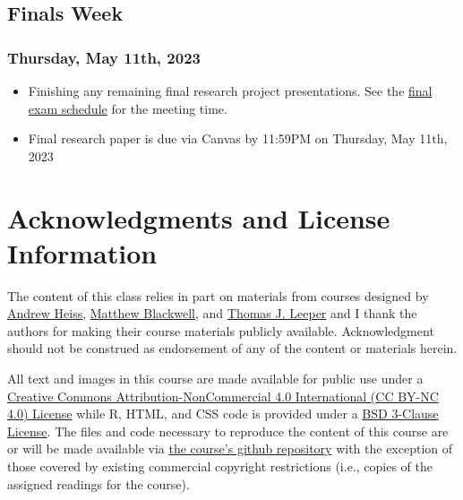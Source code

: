\documentclass[12pt,]{article}
\begin{document}
\hypertarget{finals-week}{%
\subsection{Finals Week}\label{finals-week}}

\hypertarget{thursday-may-11th-2023}{%
\subsubsection{Thursday, May 11th, 2023}\label{thursday-may-11th-2023}}

\begin{itemize}
\item
  Finishing any remaining final research project presentations. See the
  \href{https://registrar.unt.edu/exams/final-exam-schedule/spring}{final
  exam schedule} for the meeting time.
\item
  Final research paper is due via Canvas by 11:59PM on Thursday, May
  11th, 2023
\end{itemize}

\hypertarget{acknowledgments-and-license-information}{%
\section{Acknowledgments and License
Information}\label{acknowledgments-and-license-information}}

\noindent The content of this class relies in part on materials from
courses designed by
\href{https://github.com/andrewheiss/evalsp23.classes.andrewheiss.com}{Andrew
Heiss}, \href{https://github.com/mattblackwell/gov2003-f21-site}{Matthew
Blackwell}, and \href{https://github.com/leeper/designcourse}{Thomas J.
Leeper} and I thank the authors for making their course materials
publicly available. Acknowledgment should not be construed as
endorsement of any of the content or materials herein.

All text and images in this course are made available for public use
under a \href{https://creativecommons.org/licenses/by-nc/4.0/}{Creative
Commons Attribution-NonCommercial 4.0 International (CC BY-NC 4.0)
License} while R, HTML, and CSS code is provided under a
\href{https://github.com/ajnafa/PSCI-3300-Political-Research-Methods-SP23/blob/main/LICENSE}{BSD
3-Clause License}. The files and code necessary to reproduce the content
of this course are or will be made available via
\href{https://github.com/ajnafa/PSCI-3300-Political-Research-Methods-SP23/}{the
course's github repository} with the exception of those covered by
existing commercial copyright restrictions (i.e., copies of the assigned
readings for the course).
\end{document}
